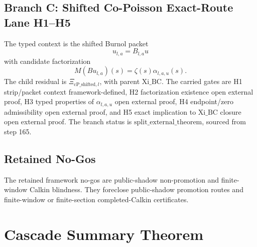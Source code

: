 \documentclass[11pt]{article}
\begin{document}
\subsection{Branch C: Shifted Co-Poisson Exact-Route Lane H1--H5}

The typed context is the shifted Burnol packet
\[
u_{l,a}=B_{l,a}u
\]
with candidate factorization
\[
M(Bu_{l,a})(s)=\zeta(s)\alpha_{l,a,u}(s).
\]
The child residual is \(\Xi_{\mathrm{cP\_shifted},l}\), with parent \(\mathrm{Xi\_BC}\). The carried gates are H1 strip/packet context framework-defined, H2 factorization existence open external proof, H3 typed properties of \(\alpha_{l,a,u}\) open external proof, H4 endpoint/zero admissibility open external proof, and H5 exact implication to \(\mathrm{Xi\_BC}\) closure open external proof. The branch status is \(\mathrm{split\_external\_theorem}\), sourced from step 165.

\subsection{Retained No-Gos}

The retained framework no-gos are public-shadow non-promotion and finite-window Calkin blindness. They foreclose public-shadow promotion routes and finite-window or finite-section completed-Calkin certificates.

\section{Cascade Summary Theorem}
\end{document}
